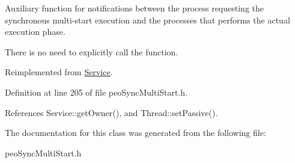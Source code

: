 Auxiliary function for notifications between the process requesting the synchronous multi-start execution and the processes that performs the actual execution phase. 

There is no need to explicitly call the function. 

Reimplemented from \hyperlink{classService_f94cc8a5c2665d4574041737e61e9ffc}{Service}.

Definition at line 205 of file peo\-Sync\-Multi\-Start.h.

References Service::get\-Owner(), and Thread::set\-Passive().

The documentation for this class was generated from the following file:\begin{CompactItemize}
\item 
peo\-Sync\-Multi\-Start.h\end{CompactItemize}
